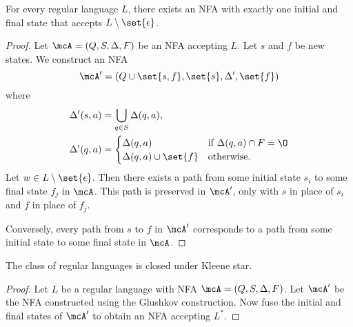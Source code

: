 
\begin{theorem*} \label{thm:glushkov}
    For every regular language $L$, there exists an NFA with exactly one
    initial and final state that accepts $L \setminus \set{\epsilon}$.
\end{theorem*}
\begin{proof}
    Let $\mcA = (Q, S, \Delta, F)$ be an NFA accepting $L$.
    Let $s$ and $f$ be new states.
    We construct an NFA \[
        \mcA' = (Q \cup \set{s, f}, \set{s}, \Delta', \set{f})
    \] where \begin{align*}
        \Delta'(s, a) &= \bigcup_{q \in S} \Delta(q, a), \\
        \Delta'(q, a) &= \begin{cases}
            \Delta(q, a) & \text{if } \Delta(q, a) \cap F = \O \\
            \Delta(q, a) \cup \set{f} & \text{otherwise}.
        \end{cases}
    \end{align*}
    Let $w \in L \setminus \set{\epsilon}$.
    Then there exists a path from some initial state $s_i$ to some final
    state $f_j$ in $\mcA$.
    This path is preserved in $\mcA'$, only with $s$ in place of $s_i$ and
    $f$ in place of $f_j$.

    Conversely, every path from $s$ to $f$ in $\mcA'$ corresponds to a
    path from some initial state to some final state in $\mcA$.
\end{proof}

\begin{theorem*} \label{thm:closure:kleene}
    The class of regular languages is closed under Kleene star.
\end{theorem*}
\begin{proof}
    Let $L$ be a regular language with NFA $\mcA = (Q, S, \Delta, F)$.
    Let $\mcA'$ be the NFA constructed using the Glushkov construction.
    Now fuse the initial and final states of $\mcA'$ to obtain an NFA
    accepting $L^*$.
\end{proof}

